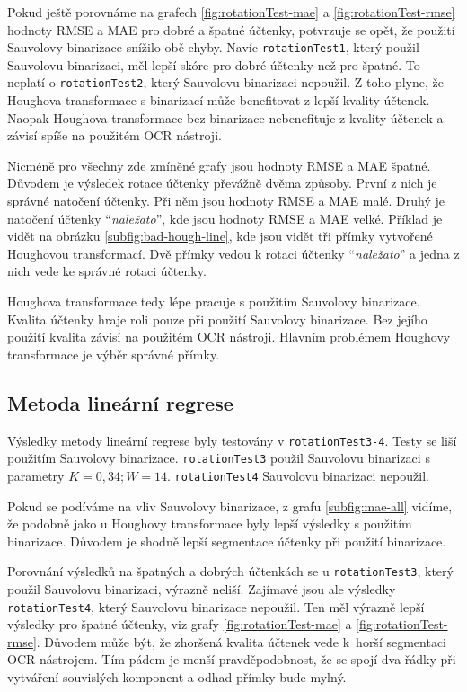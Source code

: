 \documentclass[thesis=B,czech]{FITthesis}[2019/12/23]
\def\myit#1{\texttt{#1}}
\begin{document}
Pokud ještě porovnáme na grafech \ref{fig:rotationTest-mae}
a \ref{fig:rotationTest-rmse} hodnoty RMSE a MAE pro dobré a špatné účtenky, potvrzuje se opět, že použití Sauvolovy binarizace snížilo obě chyby. Navíc \myit{rotationTest1}, který použil Sauvolovu binarizaci, měl lepší skóre pro dobré účtenky než pro špatné. To neplatí o \myit{rotationTest2}, který Sauvolovu binarizaci nepoužil. Z toho plyne, že Houghova transformace s binarizací může benefitovat z lepší kvality účtenek. Naopak Houghova transformace bez binarizace nebenefituje z kvality účtenek a závisí spíše na použitém OCR nástroji.

Nicméně pro všechny zde zmíněné grafy jsou hodnoty RMSE a MAE špatné. Důvodem je výsledek rotace účtenky převážně dvěma způsoby. První z nich je správné natočení účtenky. Při něm jsou hodnoty RMSE a MAE malé. Druhý je natočení účtenky \enquote{\textit{naležato}}, kde jsou hodnoty RMSE a MAE velké. Příklad je vidět na obrázku \ref{subfig:bad-hough-line}, kde jsou vidět tři přímky vytvořené Houghovou transformací. Dvě přímky vedou k rotaci účtenky \enquote{\textit{naležato}} a jedna z nich vede ke správné rotaci účtenky.

Houghova transformace tedy lépe pracuje s použitím Sauvolovy binarizace. Kvalita účtenky hraje roli pouze při použití Sauvolovy binarizace. Bez jejího použití kvalita závisí na použitém OCR nástroji. Hlavním problémem Houghovy transformace je výběr správné přímky.

\subsection{Metoda lineární regrese}
\label{subsec:results-linear-regression}
Výsledky metody lineární regrese byly testovány v \myit{rotationTest3-4}. Testy se liší použitím Sauvolovy binarizace. \myit{rotationTest3} použil Sauvolovu binarizaci s parametry $K=0,34; W=14$. \myit{rotationTest4} Sauvolovu binarizaci nepoužil.

Pokud se podíváme na vliv Sauvolovy binarizace, z grafu \ref{subfig:mae-all} vidíme, že podobně jako u Houghovy transformace byly lepší výsledky s použitím binarizace. Důvodem je shodně lepší segmentace účtenky při použití binarizace.

Porovnání výsledků na špatných a dobrých účtenkách se u \myit{rotationTest3}, který použil Sauvolovu binarizaci, výrazně neliší. Zajímavé jsou ale výsledky \myit{rotationTest4}, který Sauvolovu binarizace nepoužil. Ten měl výrazně lepší výsledky pro špatné účtenky, viz grafy \ref{fig:rotationTest-mae}
a \ref{fig:rotationTest-rmse}. Důvodem může být, že zhoršená kvalita účtenek vede k~horší segmentaci OCR nástrojem. Tím pádem je menší pravděpodobnost, že se spojí dva řádky při vytváření souvislých komponent a odhad přímky bude mylný.
\end{document}
